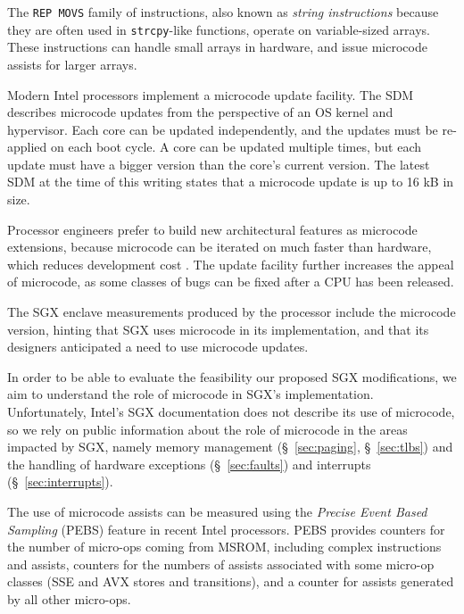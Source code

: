 The \texttt{REP MOVS} family of instructions, also known as \textit{string
instructions} because they are often used in \texttt{strcpy}-like functions,
operate on variable-sized arrays. These instructions can handle small arrays in
hardware, and issue microcode assists for larger arrays.


Modern Intel processors implement a microcode update facility. The SDM
describes microcode updates from the perspective of an OS kernel and
hypervisor. Each core can be updated independently, and the updates must be
re-applied on each boot cycle. A core can be updated multiple times, but each
update must have a bigger version than the core's current version. The latest
SDM at the time of this writing states that a microcode update is up to 16 kB
in size.

Processor engineers prefer to build new architectural features as microcode
extensions, because microcode can be iterated on much faster than hardware,
which reduces development cost \cite{intel2008genetic, intel2012clusters}. The
update facility further increases the appeal of microcode, as some classes of
bugs can be fixed after a CPU has been released.

The SGX enclave measurements produced by the processor include the microcode
version, hinting that SGX uses microcode in its implementation, and that its
designers anticipated a need to use microcode updates.

In order to be able to evaluate the feasibility our proposed SGX modifications,
we aim to understand the role of microcode in SGX's implementation.
Unfortunately, Intel's SGX documentation does not describe its use of
microcode, so we rely on public information about the role of microcode in the
areas impacted by SGX, namely memory management (\S~\ref{sec:paging},
\S~\ref{sec:tlbs}) and the handling of hardware exceptions
(\S~\ref{sec:faults}) and interrupts (\S~\ref{sec:interrupts}).


The use of microcode assists can be measured using the
\textit{Precise Event Based Sampling} (PEBS) feature in recent Intel
processors. PEBS provides counters for the number of micro-ops coming from
MSROM, including complex instructions and assists, counters for the numbers of
assists associated with some micro-op classes (SSE and AVX stores and
transitions), and a counter for assists generated by all other micro-ops.

